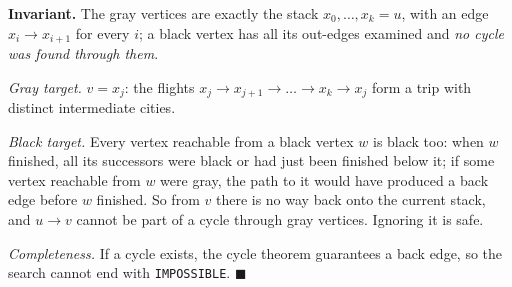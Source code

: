 \begin{invariantbox}
\textbf{Invariant.} The gray vertices are exactly the stack $x_0, \dots, x_k = u$, with an edge $x_i \to x_{i+1}$ for every $i$; a black vertex has all its out-edges examined and \emph{no cycle was found through them}.

\emph{Gray target.} $v = x_j$: the flights $x_j \to x_{j+1} \to \dots \to x_k \to x_j$ form a trip with distinct intermediate cities.

\emph{Black target.} Every vertex reachable from a black vertex $w$ is black too: when $w$ finished, all its successors were black or had just been finished below it; if some vertex reachable from $w$ were gray, the path to it would have produced a back edge before $w$ finished. So from $v$ there is no way back onto the current stack, and $u \to v$ cannot be part of a cycle through gray vertices. Ignoring it is safe.

\emph{Completeness.} If a cycle exists, the cycle theorem guarantees a back edge, so the search cannot end with \texttt{IMPOSSIBLE}. \hfill$\blacksquare$
\end{invariantbox}

